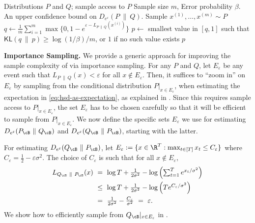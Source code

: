 \documentclass[twoside]{article}
\theoremstyle{definition}
\newcommand{\eps}{\varepsilon}
\newcommand{\prn}[1]{\left ( #1 \right )}
\newcommand{\Deps}{D_{e^{\eps}}}
\newcommand{\KL}{\mathsf{KL}}
\newcommand{\PB}{P_{\cB}}
\newcommand{\QB}{Q_{\cB}}
\begin{document}
\begin{algorithm}[t]
\caption{Monte Carlo Estimation of $\Deps(P ~\|~ Q)$.}
\label{alg:mce}
\begin{algorithmic}
\REQUIRE Distributions $P$ and $Q$; sample access to $P$
\STATE{} Sample size $m$, Error probability $\beta$.
\ENSURE An upper confidence bound on $\Deps(P ~\|~ Q)$.
\STATE Sample $x^{(1)}, \ldots, x^{(m)} \sim P$
\STATE $q \gets \frac1m \sum_{i=1}^m \max\{ 0, 1 - e^{\eps - L_{P ~\|~ Q}(x^{(i)})}\}$
\STATE $p \gets$ smallest value in $[q, 1]$ such that $\KL(q ~\|~ p) \ge \log(1/\beta) / m$, or $1$ if no such value exists
\RETURN $p$
\end{algorithmic}
\end{algorithm}

{\bf Importance Sampling.} We provide a generic approach for improving the sample complexity of  via importance sampling. For any $P$ and $Q$, let $E_{\eps}$ be any event such that $L_{P ~\|~ Q}(x) < \eps$ for all $x \notin E_{\eps}$. Then, it suffices to ``zoom in'' on $E_{\eps}$ by sampling from the conditional distribution $P|_{x \in E_{\eps}}$, when estimating the expectation in \eqref{eq:hsd-as-expectation}, as explained in . Since this requires sample access to $P|_{x \in E_{\eps}}$, the set $E_{\eps}$ has to be chosen carefully so that it will be efficient to sample from $P|_{x \in E_{\eps}}$.
We now define the specific sets $E_{\eps}$ we use for estimating $\Deps(\PB ~\|~ \QB)$ and $\Deps(\QB ~\|~ \PB)$,  starting with the latter.

For estimating $\Deps(\QB ~\|~ \PB)$, let $E_\eps := \{ x \in \R^T : \max_{t \in [T]} x_t \le C_\eps \}$ where $C_{\eps} = \frac12 - \eps \sigma^2$.
The choice of $C_\eps$ is such that for all $x \notin E_{\eps}$,
\begin{align*}
\textstyle L_{\QB ~\|~ \PB}(x) &\textstyle~=~ \log T + \frac{1}{2\sigma^2} - \log\prn{\sum_{t=1}^T e^{x_t / \sigma^2}}\\
&\textstyle~\le~ \log T + \frac{1}{2\sigma^2} - \log\prn{T e^{C_\eps / \sigma^2}}\\
&\textstyle~=~ \frac1{2\sigma^2} - \frac{C_\eps}{\sigma^2} ~=~ \eps.
\end{align*}
We show how to efficiently sample from $\QB|_{x \in E_{\eps}}$ in .
\end{document}
